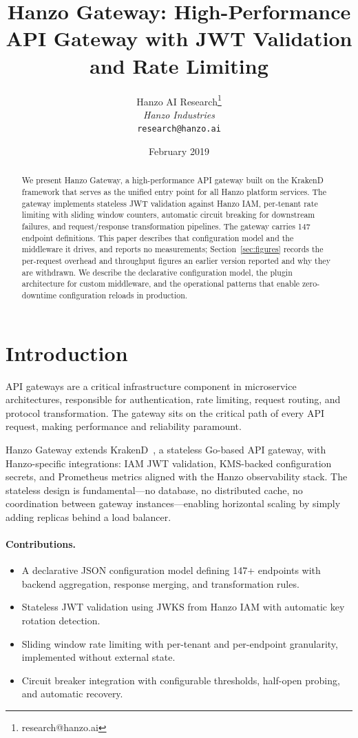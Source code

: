 \documentclass[11pt,twocolumn]{article}
\title{Hanzo Gateway: High-Performance API Gateway with JWT Validation and Rate Limiting}
\author{Hanzo AI Research\thanks{research@hanzo.ai} \\ \textit{Hanzo Industries} \\ \texttt{research@hanzo.ai}}
\date{February 2019}
\begin{document}
\hanzocoverpage

\begin{abstract}
We present Hanzo Gateway, a high-performance API gateway built on the KrakenD framework that serves as the unified entry point for all Hanzo platform services. The gateway implements stateless JWT validation against Hanzo IAM, per-tenant rate limiting with sliding window counters, automatic circuit breaking for downstream failures, and request/response transformation pipelines. The gateway carries 147 endpoint definitions. This paper describes that configuration model and the middleware it drives, and reports no measurements; Section~\ref{sec:figures} records the per-request overhead and throughput figures an earlier version reported and why they are withdrawn. We describe the declarative configuration model, the plugin architecture for custom middleware, and the operational patterns that enable zero-downtime configuration reloads in production.
\end{abstract}

\section{Introduction}

API gateways are a critical infrastructure component in microservice architectures, responsible for authentication, rate limiting, request routing, and protocol transformation. The gateway sits on the critical path of every API request, making performance and reliability paramount.

Hanzo Gateway extends KrakenD~\cite{krakend2017}, a stateless Go-based API gateway, with Hanzo-specific integrations: IAM JWT validation, KMS-backed configuration secrets, and Prometheus metrics aligned with the Hanzo observability stack. The stateless design is fundamental---no database, no distributed cache, no coordination between gateway instances---enabling horizontal scaling by simply adding replicas behind a load balancer.

\paragraph{Contributions.}
\begin{itemize}
    \item A declarative JSON configuration model defining 147+ endpoints with backend aggregation, response merging, and transformation rules.
    \item Stateless JWT validation using JWKS from Hanzo IAM with automatic key rotation detection.
    \item Sliding window rate limiting with per-tenant and per-endpoint granularity, implemented without external state.
    \item Circuit breaker integration with configurable thresholds, half-open probing, and automatic recovery.
\end{itemize}
\end{document}
